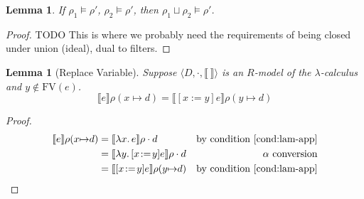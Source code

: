 \documentclass{tufte-handout}
\newcommand{\SEM}[1]{\llbracket #1 \rrbracket}
\newcommand{\LAM}[1]{\lambda #1.\,}
\newcommand{\by}[0]{\!:=\!}
\newcommand{\ext}[3]{#3(#1{\mapsto}#2)}
\newtheorem{lemma}[theorem]{Lemma}
\begin{document}
\begin{lemma}
  \label{lem:env-less-model}
  If $\rho_1 \models \rho'$, $\rho_2 \models \rho'$,
  then $\rho_1 \sqcup \rho_2 \models \rho'$.
\end{lemma}
\begin{proof}
  TODO This is where we probably need the requirements of
  being closed under union (ideal), dual to filters.
\end{proof}

\begin{lemma}[Replace Variable]
  \label{lem:change-var}
  Suppose $\langle D,\cdot, \SEM{\ } \rangle$ is an $R$-model of the
  $\lambda$-calculus and $y \notin \mathrm{FV}(e)$.
  \[
    \SEM{e} \ext{x}{ d}{\rho}
    = 
    \SEM{[x\by y]e} \ext{y}{ d}{\rho}
  \]
\end{lemma}
\begin{proof}
  \begin{align*}
    \SEM{e} \ext{x}{ d}{\rho} &= \SEM{\LAM{x}e}\rho \cdot d & \text{by condition \ref{cond:lam-app}}\\
       &= \SEM{\LAM{y}[x\by y]e}\rho \cdot d & \text{$\alpha$ conversion}\\
       &= \SEM{[x\by y]e} \ext{y}{ d}{\rho} & \text{by condition \ref{cond:lam-app}}
  \end{align*}
\end{proof}
\end{document}
